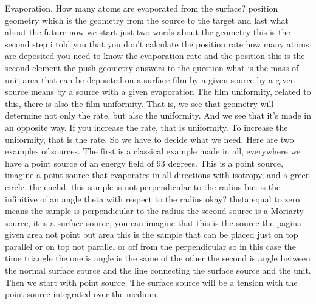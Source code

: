 Evaporation. How many atoms are evaporated from the surface? position geometry which is the geometry from the source to the target and last what about the future now we start just two words about the geometry this is the second step i told you that you don't calculate the position rate how many atoms are deposited you need to know the evaporation rate and the position this is the second element the push geometry answers to the question what is the mass of unit area that can be deposited on a surface film by a given source by a given source means by a source with a given evaporation The film uniformity, related to this, there is also the film uniformity. That is, we see that geometry will determine not only the rate, but also the uniformity. And we see that it's made in an opposite way. If you increase the rate, that is uniformity. To increase the uniformity, that is the rate. So we have to decide what we need. Here are two examples of sources. The first is a classical example made in all, everywhere we have a point source of an energy field of 93 degrees. This is a point source, imagine a point source that evaporates in all directions with isotropy, and a green circle, the euclid. this sample is not perpendicular to the radius but is the infinitive of an angle theta with respect to the radius okay? theta equal to zero means the sample is perpendicular to the radius the second source is a Moriarty source, it is a surface source, you can imagine that this is the source the pagina given area not point but area this is the sample that can be placed just on top parallel or on top not parallel or off from the perpendicular so in this case the time triangle the one is angle is the same of the other the second is angle between the normal surface source and the line connecting the surface source and the unit. Then we start with point source. The surface source will be a tension with the point source integrated over the medium.
